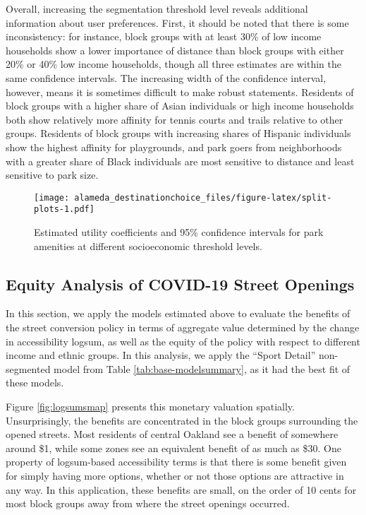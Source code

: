 \documentclass[3p, authoryear, review]{elsarticle} %
\begin{document}
Overall, increasing the segmentation threshold level reveals additional
information about user preferences. First, it should be noted that there is some
inconsistency: for instance, block groups with at least 30\% of low income
households show a lower importance of distance than block groups with either 20\%
or 40\% low income households, though all three estimates are within the same
confidence intervals. The increasing width of the confidence interval, however,
means it is sometimes difficult to make robust statements. Residents of
block groups with a higher share of Asian individuals or high income households both show
relatively more affinity for tennis courts and trails relative to other groups.
Residents of block groups with increasing shares of Hispanic individuals show
the highest affinity for playgrounds, and park goers from neighborhoods with a
greater share of Black individuals are most sensitive to distance and least
sensitive to park size.

\begin{figure}
\centering
\texttt{[image: alameda\_destinationchoice\_files/figure-latex/split-plots-1.pdf]}
\caption{\label{fig:split-plots}Estimated utility coefficients and 95\% confidence intervals for park amenities at different socioeconomic threshold levels.}
\end{figure}

\hypertarget{equity-analysis-of-covid-19-street-openings}{%
\subsection{Equity Analysis of COVID-19 Street Openings}\label{equity-analysis-of-covid-19-street-openings}}

In this section, we apply the models estimated above to evaluate the benefits of
the street conversion policy in terms of aggregate value determined by the
change in accessibility logsum, as well as the equity of the policy with respect
to different income and ethnic groups. In this analysis, we apply the ``Sport Detail''
non-segmented model from Table \ref{tab:base-modelsummary}, as it had the best
fit of these models.

Figure \ref{fig:logsumsmap} presents this monetary valuation spatially.
Unsurprisingly, the benefits are concentrated in the block groups surrounding
the opened streets. Most residents of central Oakland see a benefit of somewhere
around \$1, while some zones see an equivalent benefit of as much as \$30. One
property of logsum-based accessibility terms is that there is some benefit given
for simply having more options, whether or not those options are attractive in
any way. In this application, these benefits are small, on the order of 10 cents
for most block groups away from where the street openings occurred.
\end{document}
